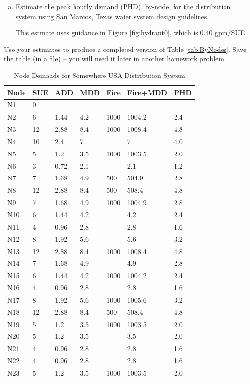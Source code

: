 \documentclass[12pt]{article}
\begin{document}
\begin{enumerate}
\begin{enumerate}[a)]
\item Estimate the peak hourly demand (PHD), by-node, for the distribution system using San Marcos, Texas water system design guidelines.

This estmate uses guidance in Figure \ref{fig:hydrant0}, which is 0.40 gpm/SUE
\end{enumerate}

Use your estimates to produce a completed version of Table \ref{tab:ByNodes}.
Save the table (in a file) -- you will need it later in another homework problem.

\begin{table}[h!]
   \centering
   \caption{Node Demands for Somewhere USA Distribution System}
   \begin{tabular}{p{0.5in}p{0.7in}p{0.7in}p{0.7in}p{0.7in}p{0.8in}p{0.7in}} %
Node & SUE & ADD & MDD & Fire & Fire+MDD & PHD \\
\hline
\hline
N1&0&~&~&~&~&\\
N2&6&1.44&4.2&1000&1004.2&2.4\\
N3&12&2.88&8.4&1000&1008.4&4.8\\
N4&10&2.4&7&&7&4.0\\
N5&5&1.2&3.5&1000&1003.5&2.0\\
N6&3&0.72&2.1&&2.1&1.2\\
N7&7&1.68&4.9&500&504.9&2.8\\
N8&12&2.88&8.4&500&508.4&4.8\\
N9&7&1.68&4.9&1000&1004.9&2.8\\
N10&6&1.44&4.2&&4.2&2.4\\
N11&4&0.96&2.8&&2.8&1.6\\
N12&8&1.92&5.6&&5.6&3.2\\
N13&12&2.88&8.4&1000&1008.4&4.8\\
N14&7&1.68&4.9&&4.9&2.8\\
N15&6&1.44&4.2&1000&1004.2&2.4\\
N16&4&0.96&2.8&&2.8&1.6\\
N17&8&1.92&5.6&1000&1005.6&3.2\\
N18&12&2.88&8.4&500&508.4&4.8\\
N19&5&1.2&3.5&1000&1003.5&2.0\\
N20&5&1.2&3.5&&3.5&2.0\\
N21&4&0.96&2.8&&2.8&1.6\\
N22&4&0.96&2.8&&2.8&1.6\\
N23&5&1.2&3.5&1000&1003.5&2.0\\

\end{tabular}
\end{table}
\end{enumerate}
\end{document}
